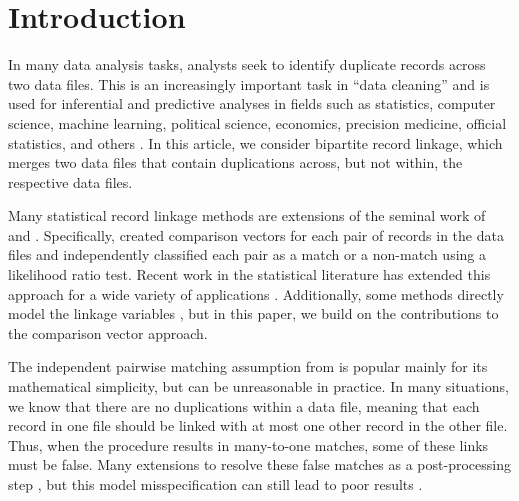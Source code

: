 \documentclass[ba]{imsart}
\begin{document}
\begin{frontmatter}
\begin{abstract}
\end{abstract}

\begin{keyword}%
\end{keyword}

\end{frontmatter}






\section{Introduction}
\label{sec:introduction}

In many data analysis tasks, analysts seek to identify duplicate records across two data files. This is an increasingly important task in ``data cleaning'' and is used for inferential and predictive analyses in fields such as statistics, computer science, machine learning, political science, economics, precision medicine, official statistics, and others \citep{christen_2012, gutman2013bayesian, DalzellReiter18, tang2020}. In this article, we consider bipartite record linkage, which merges two data files that contain duplications across, but not within, the respective data files. 

Many statistical record linkage methods are extensions of the seminal work of \cite{fellegi_theory_1969} and \cite{newcombe_automatic_1959}. Specifically, \cite{fellegi_theory_1969} created comparison vectors for each pair of records in the data files and independently classified each pair as a match or a non-match using a likelihood ratio test. Recent work in the statistical literature has extended this approach for a wide variety of applications \citep{Winkler1990, fair2004generalized, wagner2014person, gill2003english, enamorado2019using, aleshinguendel2021multifile}. Additionally, some methods directly model the linkage variables \citep{steorts_bayesian_2016, marchant_distributed_2019, betancourt2021prior}, but in this paper, we build on the contributions to the comparison vector approach. 


The independent pairwise matching assumption from \cite{fellegi_theory_1969} is popular mainly for its mathematical simplicity, but can be unreasonable in practice. In many situations, we know that there are no duplications within a data file, meaning that each record in one file should be linked with at most one other record in the other file. Thus, when the procedure results in many-to-one matches, some of these links must be false. Many extensions to \cite{fellegi_theory_1969} resolve these false matches as a post-processing step \citep{jaro1989}, but this model misspecification can still lead to poor results \citep{sadinle_bayesian_2017}.
\end{document}
